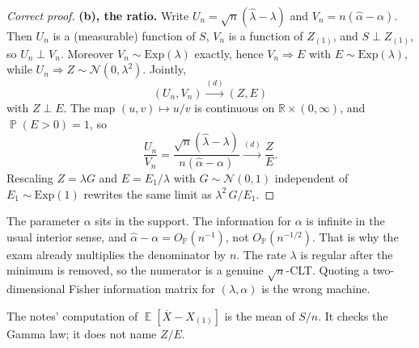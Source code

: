 \documentclass[11pt,a4paper]{article}
\DeclareMathOperator{\E}{\mathbb{E}}
\DeclareMathOperator{\Pbb}{\mathbb{P}}
\begin{document}
\begin{proof}[Correct proof]
\textbf{(b), the ratio.}
Write \( U_n=\sqrt{n}(\hat{\lambda}-\lambda) \) and \( V_n=n(\hat{\alpha}-\alpha) \). Then \( U_n \) is a (measurable) function of \( S \), \( V_n \) is a function of \( Z_{(1)} \), and \( S\perp Z_{(1)} \), so \( U_n\perp V_n \). Moreover \( V_n\sim\mathrm{Exp}(\lambda) \) exactly, hence \( V_n\Rightarrow E \) with \( E\sim\mathrm{Exp}(\lambda) \), while \( U_n\Rightarrow Z\sim\mathcal{N}(0,\lambda^{2}) \). Jointly,
\[
(U_n,V_n)
\xrightarrow{(d)}
(Z,E)
\]
with \( Z\perp E \). The map \( (u,v)\mapsto u/v \) is continuous on \( \mathbb{R}\times(0,\infty) \), and \( \Pbb(E>0)=1 \), so
\[
\frac{U_n}{V_n}
=
\frac{\sqrt{n}(\hat{\lambda}-\lambda)}{n(\hat{\alpha}-\alpha)}
\xrightarrow{(d)}
\frac{Z}{E}.
\]
Rescaling \( Z=\lambda G \) and \( E=E_1/\lambda \) with \( G\sim\mathcal{N}(0,1) \) independent of \( E_1\sim\mathrm{Exp}(1) \) rewrites the same limit as \( \lambda^{2}\,G/E_1 \).
\end{proof}

\begin{remark}
\label{rem:p11-rates}
The parameter \( \alpha \) sits in the support. The information for \( \alpha \) is infinite in the usual interior sense, and \( \hat{\alpha}-\alpha=O_{\Pbb}(n^{-1}) \), not \( O_{\Pbb}(n^{-1/2}) \). That is why the exam already multiplies the denominator by \( n \). The rate \( \lambda \) is regular after the minimum is removed, so the numerator is a genuine \( \sqrt{n} \)-CLT. Quoting a two-dimensional Fisher information matrix for \( (\lambda,\alpha) \) is the wrong machine.

The notes' computation of \( \E[\overline{X}-X_{(1)}] \) is the mean of \( S/n \). It checks the Gamma law; it does not name \( Z/E \).
\end{remark}
\end{document}

